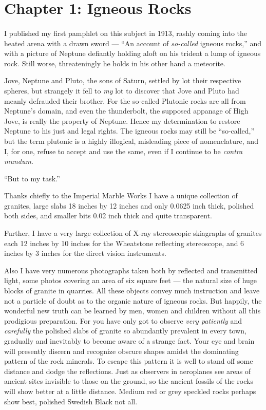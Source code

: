 \documentclass[a4paper, 12pt, oneside]{article}
\begin{document}
\section{Chapter 1: Igneous Rocks}
\paragraph{}
I published my first pamphlet on this subject in 1913, rashly coming into the heated arena with a drawn sword --- ``An account of \emph{so-called} igneous rocks,'' and with a picture of Neptune defiantly holding aloft on his trident a lump of igneous rock. Still worse, threateningly he holds in his other hand a meteorite.

Jove, Neptune and Pluto, the sons of Saturn, settled by lot their respective spheres, but strangely it fell to \emph{my} lot to discover that Jove and Pluto had meanly defrauded their brother. For the so-called Plutonic rocks are all from Neptune's domain, and even the thunderbolt, the supposed appanage of High Jove, is really the property of Neptune. Hence my determination to restore Neptune to his just and legal rights. The igneous rocks may still be ``so-called,'' but the term plutonic is a highly illogical, misleading piece of nomenclature, and I, for one, refuse to accept and use the same, even if I continue to be \emph{contra mundum}.

``But to my task.''

Thanks chiefly to the Imperial Marble Works I have a unique collection of granites, large slabs 18 inches by 12 inches and only 0.0625 inch thick, polished both sides, and smaller bits 0.02 inch thick and quite transparent.

Further, I have a very large collection of X-ray stereoscopic skiagraphs of granites each 12 inches by 10 inches for the Wheatstone reflecting stereoscope, and 6 inches by 3 inches for the direct vision instruments.

Also I have very numerous photographs taken both by reflected and transmitted light, some photos covering an area of six square feet --- the natural size of huge blocks of granite in quarries. All these objects convey much instruction and leave not a particle of doubt as to the organic nature of igneous rocks. But happily, the wonderful new truth can be learned by men, women and children without all this prodigious preparation. For you have only got to observe \emph{very patiently} and \emph{carefully} the polished slabs of granite so abundantly prevalent in every town, gradually and inevitably to become aware of a strange fact. Your eye and brain will presently discern and recognize obscure shapes amidst the dominating pattern of the rock minerals. To escape this pattern it is well to stand off some distance and dodge the reflections. Just as observers in aeroplanes see areas of ancient sites invisible to those on the ground, so the ancient fossils of the rocks will show better at a little distance. Medium red or grey speckled rocks perhaps show best, polished Swedish Black not all.
\end{document}
